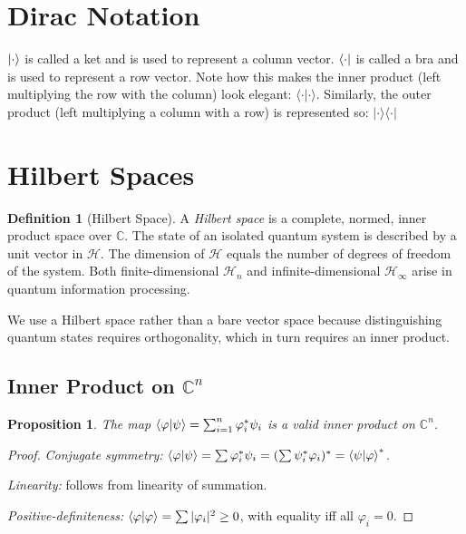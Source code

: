 \documentclass[12pt, a4paper, oneside]{report}
\theoremstyle{plain}
\newtheorem{proposition}[theorem]{Proposition}
\theoremstyle{definition}
\newtheorem{definition}[theorem]{Definition}
\theoremstyle{remark}
\newcommand{\Hcal}{\mathcal{H}}
\newcommand{\CC}{\mathbb{C}}
\begin{document}
\section {Dirac Notation}
$\ket{\cdot}$ is called a ket and is used to represent a column vector.
$\bra{\cdot}$ is called a bra and is used to represent a row vector. Note how this makes the inner product (left multiplying the row with the column) look elegant: $\langle \cdot \vert \cdot \rangle$. Similarly, the outer product (left multiplying a column with a row) is represented so: $\vert \cdot \rangle \langle \cdot \vert$





\section{Hilbert Spaces}

\begin{definition}[Hilbert Space]
	A \emph{Hilbert space} is a complete, normed, inner product space over $\CC$. The state of an isolated
	quantum system is described by a unit vector in $\Hcal$. The dimension of $\Hcal$ equals the
	number of degrees of freedom of the system. Both finite-dimensional $\Hcal_n$ and
	infinite-dimensional $\Hcal_\infty$ arise in quantum information processing.

\end{definition}

We use a Hilbert space rather than a bare vector space because distinguishing quantum states
requires orthogonality, which in turn requires an inner product.


\subsection{Inner Product on \texorpdfstring{$\CC^n$}{Cn}}

\begin{proposition}
	The map $\braket{\varphi|\psi} = \sum_{i=1}^n \varphi_i^* \psi_i$ is a valid inner product
	on $\CC^n$.
\end{proposition}

\begin{proof}
	\emph{Conjugate symmetry:}
	$\braket{\varphi|\psi} = \sum\varphi_i^*\psi_i = (\sum\psi_i^*\varphi_i)^* = \braket{\psi|\varphi}^*$.

	\emph{Linearity:} follows from linearity of summation.

	\emph{Positive-definiteness:}
	$\braket{\varphi|\varphi} = \sum|\varphi_i|^2 \geq 0$, with equality iff all $\varphi_i = 0$.
\end{proof}
\end{document}
